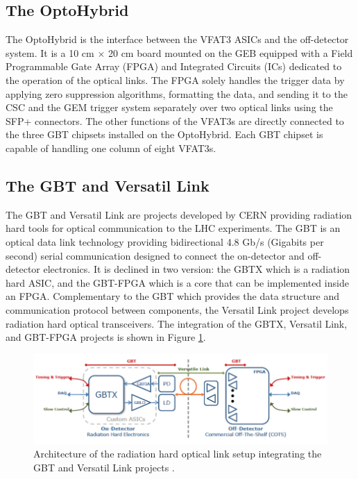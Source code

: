     \subsection{The OptoHybrid}

      The OptoHybrid is the interface between the VFAT3 ASICs and the off-detector system. It is a 10 cm $ \times $ 20 cm board mounted on the GEB equipped with a Field Programmable Gate Array (FPGA) and Integrated Circuits (ICs) dedicated to the operation of the optical links. The FPGA solely handles the trigger data by applying zero suppression algorithms, formatting the data, and sending it to the CSC and the GEM trigger system separately over two optical links using the SFP+ connectors. The other functions of the VFAT3s are directly connected to the three GBT chipsets installed on the OptoHybrid. Each GBT chipset is capable of handling one column of eight VFAT3s.

    \subsection{The GBT and Versatil Link}

      The GBT \cite{Moreira:1235836} and Versatil Link \cite{Soos:1609037} are projects developed by CERN providing radiation hard tools for optical communication to the LHC experiments. The GBT is an optical data link technology providing bidirectional 4.8 Gb/s (Gigabits per second) serial communication designed to connect the on-detector and off-detector electronics. It is declined in two version: the GBTX which is a radiation hard ASIC, and the GBT-FPGA which is a core that can be implemented inside an FPGA. Complementary to the GBT which provides the data structure and communication protocol between components, the Versatil Link project develops radiation hard optical transceivers. The integration of the GBTX, Versatil Link, and GBT-FPGA projects is shown in Figure \ref{fig:II-2-gbt-versatile}. \\

      \begin{figure}[h!]
        \centering
        \includegraphics[width=\textwidth]{img/II-2-daq/gbt-versatile.pdf}
        \caption{Architecture of the radiation hard optical link setup integrating the GBT and Versatil Link projects \cite{Moreira:1235836}.}
        \label{fig:II-2-gbt-versatile}
      \end{figure}

